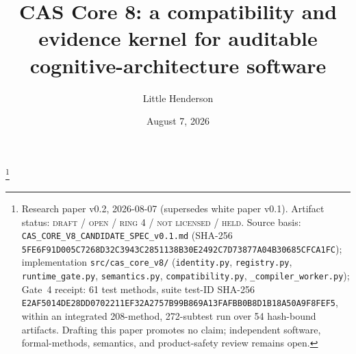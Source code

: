 \documentclass[11pt]{amsart}
\theoremstyle{definition}
\theoremstyle{remark}
\begin{document}
\title[CAS Core 8: a compatibility and evidence kernel]{CAS Core 8: a compatibility and evidence kernel for auditable cognitive-architecture software}
\author{Little Henderson}
\thanks{Research paper v0.2, 2026-08-07 (supersedes white paper v0.1). Artifact status: \textsc{draft / open / ring 4 / not licensed / held}. Source basis: \texttt{CAS\_CORE\_V8\_CANDIDATE\_SPEC\_v0.1.md} (SHA-256 \texttt{5FE6F91D005C7268D32C3943C2851138B30E2492C7D73877A04B30685CFCA1FC}); implementation \texttt{src/cas\_core\_v8/} (\texttt{identity.py}, \texttt{registry.py}, \texttt{runtime\_gate.py}, \texttt{semantics.py}, \texttt{compatibility.py}, \texttt{\_compiler\_worker.py}); Gate~4 receipt: 61 test methods, suite test-ID SHA-256 \texttt{E2AF5014DE28DD0702211EF32A2757B99B869A13FAFBB0B8D1B18A50A9F8FEF5}, within an integrated 208-method, 272-subtest run over 54 hash-bound artifacts. Drafting this paper promotes no claim; independent software, formal-methods, semantics, and product-safety review remains open.}
\date{August 7, 2026}
\end{document}
